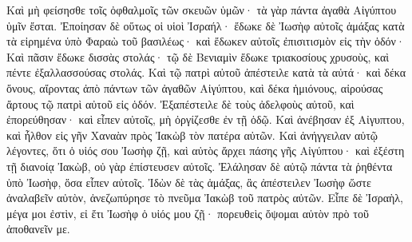 {Καὶ μὴ φείσησθε τοῖς ὀφθαλμοῖς τῶν σκευῶν ὑμῶν· τὰ γὰρ πάντα ἀγαθὰ Αἰγύπτου ὑμῖν ἔσται.
Ἐποίησαν δὲ οὕτως οἱ υἱοὶ Ἰσραήλ· ἔδωκε δὲ Ἰωσὴφ αὐτοῖς ἁμάξας κατὰ τὰ εἰρημένα ὑπὸ Φαραὼ τοῦ βασιλέως· καὶ ἔδωκεν αὐτοῖς ἐπισιτισμὸν εἰς τὴν ὁδόν·
Καὶ πᾶσιν ἔδωκε δισσὰς στολάς· τῷ δὲ Βενιαμὶν ἔδωκε τριακοσίους χρυσοὺς, καὶ πέντε ἐξαλλασσούσας στολάς.
Καὶ τῷ πατρὶ αὐτοῦ ἀπέστειλε κατὰ τὰ αὐτά· καὶ δέκα ὄνους, αἴροντας ἀπὸ πάντων τῶν ἀγαθῶν Αἰγύπτου, καὶ δέκα ἡμιόνους, αἰρούσας ἄρτους τῷ πατρὶ αὐτοῦ εἰς ὁδόν.
Ἐξαπέστειλε δὲ τοὺς ἀδελφοὺς αὐτοῦ, καὶ ἐπορεύθησαν· καὶ εἶπεν αὐτοῖς, μὴ ὀργίζεσθε ἐν τῇ ὁδῷ.
Καὶ ἀνέβησαν ἐξ Αἰγυπτου, καὶ ἦλθον εἰς γῆν Χαναὰν πρὸς Ἰακὼβ τὸν πατέρα αὐτῶν.
Καὶ ἀνήγγειλαν αὐτῷ λέγοντες, ὅτι ὁ υἱός σου Ἰωσὴφ ζῇ, καὶ αὐτὸς ἄρχει πάσης γῆς Αἰγύπτου· καὶ ἐξέστη τῇ διανοίᾳ Ἰακὼβ, οὐ γὰρ ἐπίστευσεν αὐτοῖς.
Ἐλάλησαν δὲ αὐτῷ πάντα τὰ ῥηθέντα ὑπὸ Ἰωσὴφ, ὅσα εἶπεν αὐτοῖς. Ἰδὼν δὲ τὰς ἁμάξας, ἃς ἀπέστειλεν Ἰωσὴφ ὥστε ἀναλαβεῖν αὐτὸν, ἀνεζωπύρησε τὸ πνεῦμα Ἰακὼβ τοῦ πατρὸς αὐτῶν.
Εἶπε δὲ Ἰσραὴλ, μέγα μοι ἐστὶν, εἰ ἔτι Ἰωσὴφ ὁ υἱός μου ζῇ· πορευθεὶς ὄψομαι αὐτὸν πρὸ τοῦ ἀποθανεῖν με.

}
